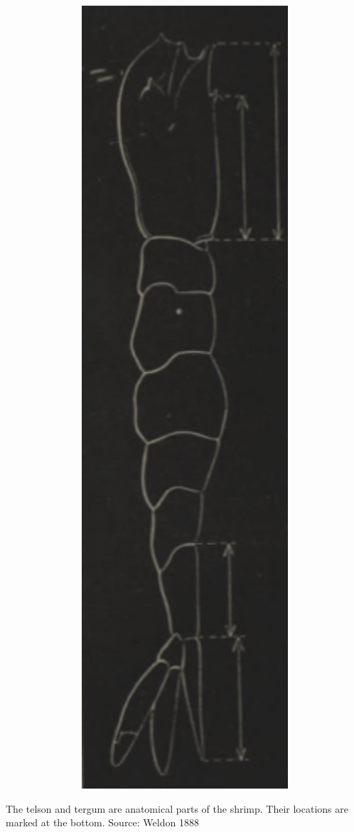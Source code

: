 \documentclass[
  letterpaper,
  DIV=11,
  numbers=noendperiod,
  oneside]{scrreprt}
\begin{document}
\begin{marginfigure}

{\centering \includegraphics[width=1.5\textwidth,height=\textheight]{./www/shrimp-organs.png}

}

\caption{\label{fig-telson-tergum}The telson and tergum are anatomical
parts of the shrimp. Their locations are marked at the bottom. Source:
Weldon 1888}

\end{marginfigure}
\end{document}
